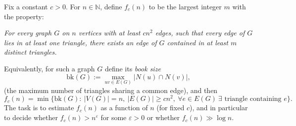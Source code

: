 Fix a constant $c>0$. For $n\in\mathbb{N}$, define $f_c(n)$ to be the largest integer $m$ with the property:

\emph{For every graph $G$ on $n$ vertices with at least $c n^2$ edges, such that every edge of $G$ lies in at least one triangle, there exists an edge of $G$ contained in at least $m$ distinct triangles.}

Equivalently, for such a graph $G$ define its \emph{book size}
\[
\mathrm{bk}(G):=\max_{uv\in E(G)}\bigl|N(u)\cap N(v)\bigr|,
\]
(the maximum number of triangles sharing a common edge), and then
\[
 f_c(n)=\min\{\mathrm{bk}(G):\ |V(G)|=n,\ |E(G)|\ge c n^2,\ \forall e\in E(G)\ \exists\text{ triangle containing }e\}.
\]
The task is to estimate $f_c(n)$ as a function of $n$ (for fixed $c$), and in particular to decide whether $f_c(n)>n^{\varepsilon}$ for some $\varepsilon>0$ or whether $f_c(n)\gg \log n$.
